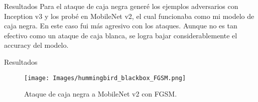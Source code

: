 \documentclass[10pt]{beamer}
\begin{document}
\begin{frame}{Resultados}
\justify	
\small
Para el ataque de caja negra generé los ejemplos adversarios con Inception v3 y los probé en MobileNet v2, el cual funcionaba como mi modelo de caja negra. En este caso fui más agresivo con los ataques. Aunque no es tan efectivo como un ataque de caja blanca, se logra bajar considerablemente el accuracy del modelo. 
%
\begin{table}[]
\centering
{}
\caption{Ataque de caja negra a MobileNet v2.}
\end{table}

\end{frame}

\begin{frame}{Resultados}
\justify	
\small

\begin{figure}[H]
\centering
\texttt{[image: Images/hummingbird\_blackbox\_FGSM.png]}
\caption{Ataque de caja negra a MobileNet v2 con FGSM.}
\end{figure}

\end{frame}
\end{document}
